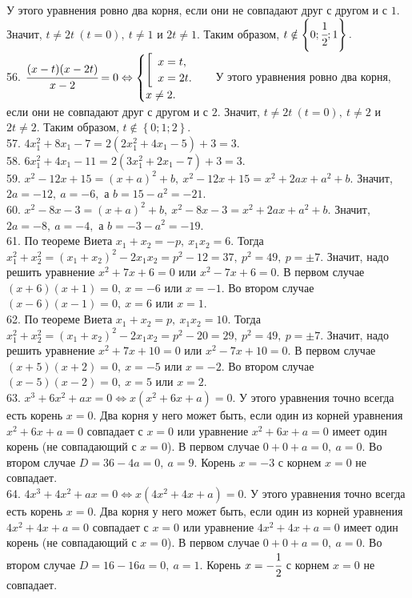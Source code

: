 \documentclass[12pt]{article}
\begin{document}
У этого уравнения ровно два корня, если они не совпадают друг с другом и с $1.$ Значит, $t\neq2t\ (t=0),\ t\neq1$ и $2t\neq1.$ Таким образом, $t\notin\left\{0; \cfrac{1}{2}; 1\right\}.$\\
56. $\cfrac{(x-t)(x-2t)}{x-2}=0\Leftrightarrow\begin{cases}\left[\begin{array}{l}x=t,\\ x=2t.\end{array}\right.\\x\neq2.\end{cases}$
У этого уравнения ровно два корня, если они не совпадают друг с другом и с $2.$ Значит, $t\neq2t\ (t=0),\ t\neq2$ и $2t\neq2.$ Таким образом, $t\notin\left\{0; 1; 2\right\}.$\\
57. $4x_1^2+8x_1-7=2(2x_1^2+4x_1-5)+3=3.$\\
58. $6x_1^2+4x_1-11=2(3x_1^2+2x_1-7)+3=3.$\\
59. $x^2-12x+15=(x+a)^2+b,\ x^2-12x+15=x^2+2ax+a^2+b.$ Значит, $2a=-12,\ a=-6,$ а $b=15-a^2=-21.$\\
60. $x^2-8x-3=(x+a)^2+b,\ x^2-8x-3=x^2+2ax+a^2+b.$ Значит, $2a=-8,\ a=-4,$ а $b=-3-a^2=-19.$\\
61. По теореме Виета $x_1+x_2=-p,\ x_1x_2=6.$ Тогда $x_1^2+x_2^2=(x_1+x_2)^2-2x_1x_2=p^2-12=37,\ p^2=49,\ p=\pm7.$ Значит, надо решить уравнение $x^2+7x+6=0$ или  $x^2-7x+6=0.$ В первом случае $(x+6)(x+1)=0,\ x=-6$ или $x=-1.$ Во втором случае $(x-6)(x-1)=0,\ x=6$ или $x=1.$\\
62. По теореме Виета $x_1+x_2=p,\ x_1x_2=10.$ Тогда $x_1^2+x_2^2=(x_1+x_2)^2-2x_1x_2=p^2-20=29,\ p^2=49,\ p=\pm7.$ Значит, надо решить уравнение $x^2+7x+10=0$ или  $x^2-7x+10=0.$ В первом случае $(x+5)(x+2)=0,\ x=-5$ или $x=-2.$ Во втором случае $(x-5)(x-2)=0,\ x=5$ или $x=2.$\\
63. $x^3+6x^2+ax=0\Leftrightarrow x(x^2+6x+a)=0.$ У этого уравнения точно всегда есть корень $x=0.$ Два корня у него может быть, если один из корней уравнения
$x^2+6x+a=0$ совпадает с $x=0$ или уравнение $x^2+6x+a=0$ имеет один корень (не совпадающий с $x=0$). В первом случае $0+0+a=0,\ a=0.$ Во втором случае $D=36-4a=0,\ a=9.$ Корень $x=-3$ с корнем $x=0$ не совпадает.\\
64. $4x^3+4x^2+ax=0\Leftrightarrow x(4x^2+4x+a)=0.$ У этого уравнения точно всегда есть корень $x=0.$ Два корня у него может быть, если один из корней уравнения
$4x^2+4x+a=0$ совпадает с $x=0$ или уравнение $4x^2+4x+a=0$ имеет один корень (не совпадающий с $x=0$). В первом случае $0+0+a=0,\ a=0.$ Во втором случае $D=16-16a=0,\ a=1.$ Корень $x=-\cfrac{1}{2}$ с корнем $x=0$ не совпадает.\\
\end{document}
